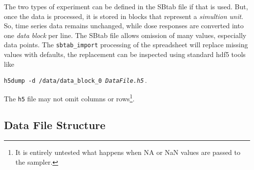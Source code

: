 \documentclass[utf8,english,DIV=12,12pt]{scrartcl}
\newcommand{\standard}[1]{\textsf{#1}}
\begin{document}
The two types of experiment can be defined in the \standard{SBtab}
file if that is used. But, once the data is processed, it is stored in
blocks that represent a \emph{simultion unit}. So, time series data
remains unchanged, while dose responses are converted into one
\emph{data block} per line. The \standard{SBtab} file allows omission
of many values, especially data points. The \texttt{sbtab\_import}
processing of the spreadsheet will replace missing values with
defaults, the replacement can be inspected using standard
\standard{hdf5} tools like
\begin{center}
\texttt{h5dump -d /data/data\_block\_0 \emph{DataFile.h5}}\,.
\end{center}
The \texttt{h5} file may not omit columns or
rows\footnote{It is entirely untested what happens when NA or NaN
  values are passed to the sampler.}.

\subsection{Data File Structure}
\label{sec:h5structure}
\end{document}

